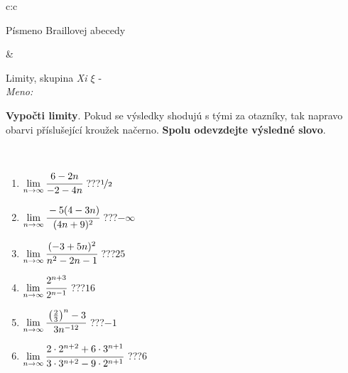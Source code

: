 \documentclass[10pt]{report}
\begin{document}
\begin{tabular}{c:c}
\begin{minipage}[c][104.5mm][t]{0.5\linewidth}
\begin{center}
\begin{minipage}{0.20\linewidth}
\begin{center}
{\small Písmeno Braillovej abecedy}
\end{center}
\end{minipage}
\end{center}
\end{minipage}
&
\begin{minipage}[c][104.5mm][t]{0.5\linewidth}
\begin{center}
\vspace{7mm}
{\huge Limity, skupina \textit{Xi $\xi$} -}\\[5mm]
\textit{Meno:}\phantom{xxxxxxxxxxxxxxxxxxxxxxxxxxxxxxxxxxxxxxxxxxxxxxxxxxxxxxxxxxxxxxxxx}\\[5mm]
\begin{minipage}{0.95\linewidth}
\begin{center}
\textbf{Vypočti limity}. Pokud se výsledky shodujú s tými za otazníky, tak napravo\\obarvi příslušející kroužek načerno. \textbf{Spolu odevzdejte výsledné slovo}.
\end{center}
\end{minipage}
\\[1mm]
\begin{minipage}{0.79\linewidth}
\begin{center}
\begin{varwidth}{\linewidth}
\begin{enumerate}
\normalsize
\item $\lim\limits_{n\to\infty}\cfrac{6-2n}{-2-4n}$\quad \dotfill\; ???\;\dotfill \quad $\nicefrac{1}{2}$
\item $\lim\limits_{n\to\infty}\cfrac{-5(4-3n)}{(4n+9)^2}$\quad \dotfill\; ???\;\dotfill \quad $-\infty$
\item $\lim\limits_{n\to\infty}\cfrac{(-3+5n)^2}{n^2-2n-1}$\quad \dotfill\; ???\;\dotfill \quad $25$
\item $\lim\limits_{n\to\infty}\cfrac{2^{n+3}}{2^{n-1}}$\quad \dotfill\; ???\;\dotfill \quad $16$
\item $\lim\limits_{n\to\infty}\cfrac{\left(\frac{2}{3}\right)^n -3}{3n^{-12}}$\quad \dotfill\; ???\;\dotfill \quad $-1$
\item $\lim\limits_{n\to\infty}\cfrac{2\cdot 2^{n+2}+6\cdot 3^{n+1}}{3\cdot 3^{n+2}-9\cdot 2^{n+1}}$\quad \dotfill\; ???\;\dotfill \quad $6$
\end{enumerate}
\end{varwidth}
\end{center}
\end{minipage}
\begin{minipage}{0.20\linewidth}

\end{minipage}
\end{center}
\end{minipage}
\end{tabular}
\end{document}
